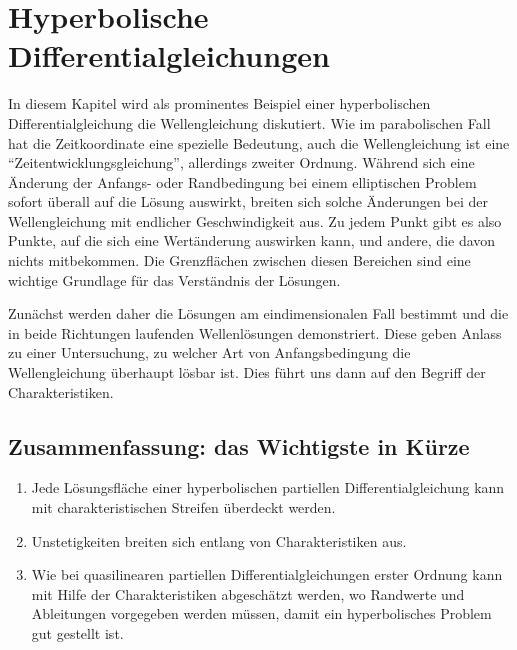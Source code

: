 %
%
%
\chapter{Hyperbolische Differentialgleichungen\label{chapter-hyperbolisch}}
\rhead{}
In diesem Kapitel wird als prominentes Beispiel einer hyperbolischen
Differentialgleichung die Wellengleichung diskutiert.
Wie im parabolischen Fall hat die Zeitkoordinate eine spezielle Bedeutung,
auch die Wellengleichung ist eine ``Zeitentwicklungsgleichung'', allerdings
zweiter Ordnung. Während sich eine Änderung der Anfangs- oder Randbedingung
bei einem elliptischen Problem sofort überall auf die Lösung auswirkt,
breiten sich solche Änderungen bei der Wellengleichung mit endlicher
Geschwindigkeit aus. Zu jedem Punkt gibt es also Punkte, auf die sich eine
Wertänderung auswirken kann, und andere, die davon nichts mitbekommen.
Die Grenzflächen zwischen diesen Bereichen sind eine wichtige Grundlage
für das Verständnis der Lösungen.

Zunächst werden daher die Lösungen 
am eindimensionalen Fall bestimmt und die in beide Richtungen laufenden 
Wellenlösungen demonstriert. Diese geben Anlass zu einer Untersuchung,
zu welcher Art von Anfangsbedingung die Wellengleichung überhaupt
lösbar ist. Dies führt uns dann auf den Begriff der Charakteristiken.









\section{Zusammenfassung: das Wichtigste in Kürze}
\begin{enumerate}
\item Jede Lösungsfläche einer hyperbolischen partiellen Differentialgleichung
kann mit charakteristischen Streifen überdeckt werden.
\item Unstetigkeiten breiten sich entlang von Charakteristiken aus.
\item Wie bei quasilinearen partiellen Differentialgleichungen erster
Ordnung kann mit Hilfe der Charakteristiken abgeschätzt werden, wo
Randwerte und Ableitungen vorgegeben werden müssen, damit ein hyperbolisches
Problem gut gestellt ist.
\end{enumerate}

